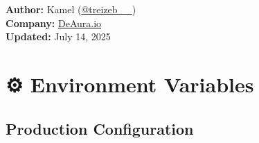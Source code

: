 \documentclass[11pt,a4paper]{article}
\begin{document}
\begin{titlepage}
    \vfill
    
    {\large\textbf{Author:} Kamel (\href{https://x.com/treizeb__}{@treizeb\_\_})\\
    \textbf{Company:} \href{https://deaura.io}{DeAura.io}\\
    \textbf{Updated:} July 14, 2025\par}
\end{titlepage}

\newpage
\tableofcontents
\newpage

\section{⚙️ Environment Variables}

\subsection{Production Configuration}
\end{document}

